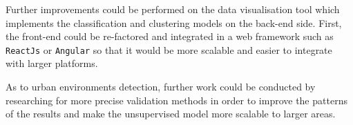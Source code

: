 \documentclass[bsc,frontabs,twoside,singlespacing, parskip,deptreport]{infthesis}     %
\begin{document}
Further improvements could be performed on the data visualisation tool which implements the classification and clustering models on the back-end side. First, the front-end could be re-factored and integrated in a web framework such as \texttt{ReactJs} \cite{angular} or \texttt{Angular} \cite{angular} so that it would be more scalable and easier to integrate with larger platforms.

As to urban environments detection, further work could be conducted by researching for more precise validation methods in order to improve the patterns of the results and make the unsupervised model more scalable to larger areas.






\end{document}
